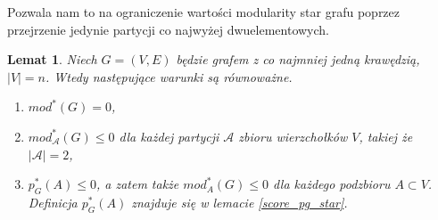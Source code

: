 \documentclass[letterpaper,12pt]{article}
\newtheorem{lemma}{Lemat}
\begin{document}
Pozwala nam to na ograniczenie wartości modularity star grafu poprzez przejrzenie jedynie partycji co najwyżej dwuelementowych.\\

\begin{lemma}
  \label{mod_star_eq}
  Niech \(G = (V,E)\) będzie grafem z co najmniej jedną krawędzią, \(|V|=n\). Wtedy następujące warunki są równoważne.
  \begin{enumerate}
    \item \(mod^*(G) = 0\),
    \item \(mod^*_{\mathcal{A}}(G) \leq 0\) dla każdej partycji \(\mathcal{A}\) zbioru wierzchołków \(V\), takiej że \(|\mathcal{A}| = 2\),
    \item \(p_G^*(A) \leq 0\), a zatem także \(mod_A^*(G) \leq 0\) dla każdego podzbioru \(A \subset V\). Definicja \(p_G^*(A)\) znajduje się w lemacie \ref{score_pg_star}.
  \end{enumerate}
\end{lemma}
\end{document}
